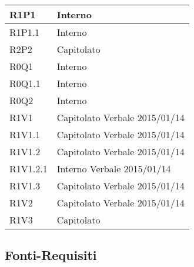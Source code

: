 \begin{center}
\begin{longtable}{| p{4cm} | p{4cm} |}

		R1P1  &  Interno \\
		\hline
		R1P1.1  &  Interno \\
		\hline
		R2P2  &  Capitolato \\
		\hline



		R0Q1  &  Interno \\
		\hline
		R0Q1.1  &  Interno \\
		\hline
		R0Q2  &  Interno \\
		\hline




		R1V1 &  Capitolato \newline Verbale 2015/01/14 \\
		\hline
		R1V1.1  &  Capitolato \newline Verbale 2015/01/14 \\
		\hline
		R1V1.2  &  Capitolato \newline Verbale 2015/01/14 \\
		\hline
		R1V1.2.1  &  Interno \newline Verbale 2015/01/14 \\
		\hline
		R1V1.3  &  Capitolato \newline Verbale 2015/01/14 \\
		\hline
		R1V2  &  Capitolato \newline Verbale 2015/01/14 \\
		\hline
		R1V3  &  Capitolato \\
		\hline

	\end{longtable}
	\egroup
	\end{center}


	\subsection{Fonti-Requisiti} %
	\label{sub:fonti_requisiti}

